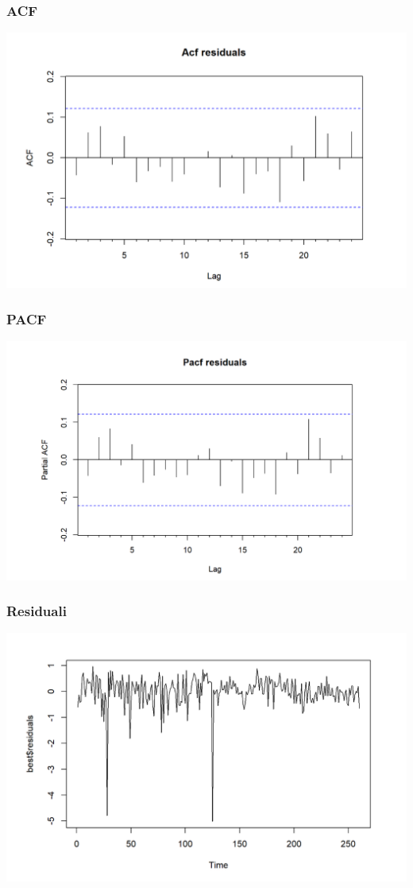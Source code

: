 \documentclass[10pt]{beamer}
\begin{document}
\begin{frame}
\frametitle{ACF}
\includegraphics[width=1\textwidth]{AcfB.png}
\end{frame}

\begin{frame}
\frametitle{PACF}
\includegraphics[width=1\textwidth]{PacfB.png}
\end{frame}


\begin{frame}
\frametitle{Residuali}
\includegraphics[width=1\textwidth]{best_res_B.png}
\end{frame}
\end{document}
